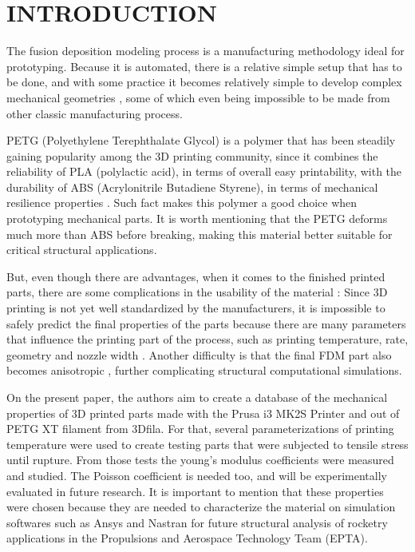 \documentclass[10pt,fleqn,a4paper,twoside]{article}
\begin{document}
\section{INTRODUCTION}

The fusion deposition modeling process is a manufacturing methodology ideal for prototyping. Because it is automated, there is a relative simple setup that has to be done, and with some practice it becomes relatively simple to develop complex mechanical geometries \citep{fdm_today}, some of which even being impossible to be made from other classic manufacturing process.   

PETG (Polyethylene Terephthalate Glycol) is a polymer that has been steadily gaining popularity among the 3D printing community, since it combines the reliability of PLA (polylactic acid), in terms of overall easy printability, with the durability of ABS (Acrylonitrile Butadiene Styrene), in terms of mechanical resilience properties \citep{tiposfilamento}. Such fact makes this polymer a good choice when prototyping mechanical parts. It is worth mentioning that the PETG deforms much more than ABS before breaking, making this material better suitable for critical structural applications. 

But, even though there are advantages, when it comes to the finished printed parts, there are some complications in the usability of the material \citep{3Dcomplication}: Since 3D printing is not yet well standardized by the manufacturers, it is impossible to safely predict the final properties of the parts because there are many parameters that influence the printing part of the process, such as printing temperature, rate, geometry and nozzle width \citep{ABS_PLA_today}. Another difficulty is that the final FDM part also becomes anisotropic \citep{PETG}, further complicating structural computational simulations. 

On the present paper, the authors aim to create a database of the mechanical properties of 3D printed parts made with the Prusa i3 MK2S Printer and out of PETG XT filament from 3Dfila. For that, several parameterizations of printing temperature were used to create testing parts that were subjected to tensile stress until rupture. From those tests the young's modulus coefficients were measured and studied. The Poisson coefficient is needed too, and will be experimentally evaluated in future research. It is important to mention that these properties were chosen because they are needed to characterize the material on simulation softwares such as Ansys and Nastran for future structural analysis of rocketry applications in the Propulsions and Aerospace Technology Team (EPTA).  
\end{document}
